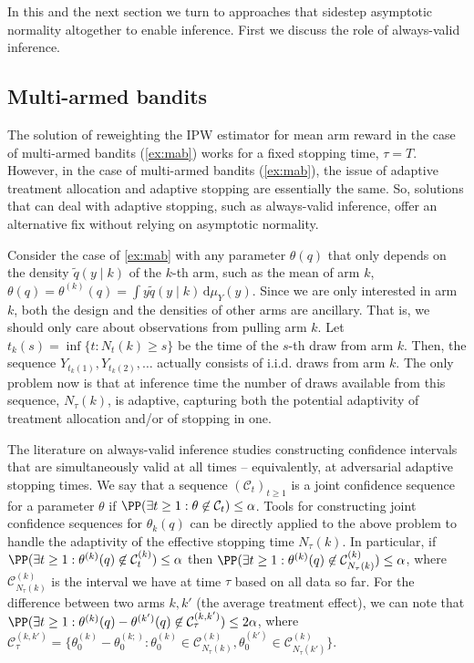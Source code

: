 In this and the next section we turn to approaches that sidestep asymptotic normality altogether to enable inference. First we discuss the role of always-valid inference.

\subsection{Multi-armed bandits}

The solution of reweighting the IPW estimator for mean arm reward in the case of multi-armed bandits (\cref{ex:mab}) works for a fixed stopping time, $\tau=T$. However, in the case of multi-armed bandits (\cref{ex:mab}), the issue of adaptive treatment allocation and adaptive stopping are essentially the same. So, solutions that can deal with adaptive stopping, such as always-valid inference, offer an alternative fix without relying on asymptotic normality. 

Consider the case of \cref{ex:mab} with any parameter $\theta(q)$ that only depends on the density $\widetilde q(y\mid k)$ of the $k$-th arm, such as the mean of arm $k$, $\theta(q)=\theta^{(k)}(q)=\int y\widetilde q(y\mid k)\,\mathrm{d}\mu_Y(y)$. 
Since we are only interested in arm $k$, both the design and the densities of other arms are ancillary. That is, we should only care about observations from pulling arm $k$. Let $t_k(s)=\inf\{t:
N_t(k)\geq s\}$ be the time of the $s$-th draw from arm $k$. Then, the sequence $Y_{t_k(1)},Y_{t_k(2)},\dots$ actually consists of i.i.d. draws from arm $k$. The only problem now is that at inference time the number of draws available from this sequence, $N_\tau(k)$, is adaptive, capturing both the potential adaptivity of treatment allocation and/or of stopping in one.

The literature on always-valid inference studies constructing confidence intervals that are simultaneously valid at all times -- equivalently, at adversarial adaptive stopping times. We say that a sequence $(\mathcal{C}_t)_{t \geq 1}$ is a joint confidence sequence for a parameter $\theta$ if $\PP(\exists t \geq 1 : \theta \not\in \mathcal{C}_t ) \leq \alpha$. Tools for constructing joint confidence sequences for $\theta_k(q)$ can be directly applied to the above problem to handle the adaptivity of the effective stopping time $N_\tau(k)$. In particular, if $\PP(\exists t \geq 1 : \theta^{(k)}(q) \not\in \mathcal{C}^{(k)}_t ) \leq \alpha$ then $\PP(\exists t \geq 1 : \theta^{(k)}(q) \not\in \mathcal{C}^{(k)}_{N_\tau(k)} ) \leq \alpha$, where $\mathcal{C}^{(k)}_{N_\tau(k)}$ is the interval we have at time $\tau$ based on all data so far. For the difference between two arms $k,k'$ (the average treatment effect), we can note that $\PP(\exists t \geq 1 : \theta^{(k)}(q)-\theta^{(k')}(q) \not\in \mathcal{C}^{(k,k')}_\tau ) \leq 2\alpha$, where $\mathcal{C}^{(k,k')}_\tau=\{\theta^{(k)}_0-\theta^{(k;)}_0:\theta^{(k)}_0\in\mathcal{C}^{(k)}_{N_\tau(k)},\theta^{(k')}_0\in\mathcal{C}^{(k)}_{N_\tau(k')}\}$.




